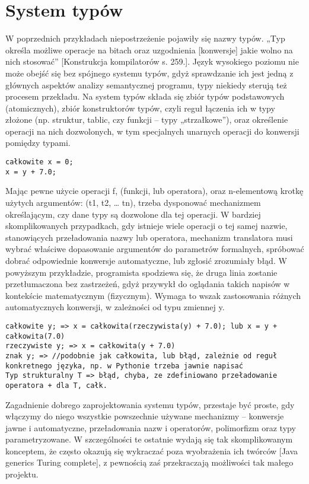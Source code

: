 \section{System typów}
W poprzednich przykładach niepostrzeżenie pojawiły się nazwy typów. „Typ określa możliwe operacje na bitach oraz uzgodnienia [konwersje] jakie wolno na nich stosować” [Konstrukcja kompilatorów s. 259.]. Język wysokiego poziomu nie może obejść się bez spójnego systemu typów, gdyż sprawdzanie ich jest jedną z głównych aspektów analizy semantycznej programu, typy niekiedy sterują też procesem przekładu.
Na system typów składa się zbiór typów podstawowych (atomicznych), zbiór konstruktorów typów, czyli reguł łączenia ich w typy złożone (np. struktur, tablic, czy funkcji – typy „strzałkowe”), oraz określenie operacji na nich dozwolonych, w tym specjalnych unarnych operacji do konwersji pomiędzy typami.
\begin{lstlisting}
całkowite x = 0;
x = y + 7.0;
\end{lstlisting}
Mając pewne użycie operacji f, (funkcji, lub operatora), oraz n-elementową krotkę użytych argumentów: (t1, t2, … tn), trzeba dysponować mechanizmem określającym, czy dane typy są dozwolone dla tej operacji. W bardziej skomplikowanych przypadkach, gdy istnieje wiele operacji o tej samej nazwie,  stanowiących przeładowania nazwy lub operatora, mechanizm translatora musi wybrać właściwe dopasowanie argumentów do parametrów formalnych, spróbować dobrać odpowiednie konwersje automatyczne, lub zgłosić zrozumiały błąd.
W powyższym przykładzie, programista spodziewa się, że druga linia zostanie przetłumaczona bez zastrzeżeń, gdyż przywykł do oglądania takich napisów w kontekście matematycznym (fizycznym). Wymaga to wszak zastosowania różnych automatycznych konwersji, w zależności od typu zmiennej y.
\begin{lstlisting}
całkowite y; => x = całkowita(rzeczywista(y) + 7.0); lub x = y + całkowita(7.0)
rzeczywiste y; => x = całkowita(y + 7.0)
znak y; => //podobnie jak całkowita, lub błąd, zależnie od reguł konkretnego języka, np. w Pythonie trzeba jawnie napisać 
Typ strukturalny T => błąd, chyba, ze zdefiniowano przeładowanie operatora + dla T, całk.
\end{lstlisting}
Zagadnienie dobrego zaprojektowania systemu typów, przestaje być proste, gdy włączymy do niego wszystkie powszechnie używane mechanizmy – konwersje jawne i automatyczne, przeładowania nazw i operatorów, polimorfizm oraz typy parametryzowane. W szczególności te ostatnie wydają się tak skomplikowanym konceptem, że często okazują się wykraczać poza wyobrażenia ich twórców [Java generics Turing complete], z pewnością zaś przekraczają możliwości tak małego projektu.
